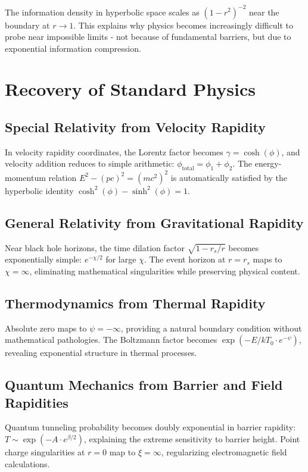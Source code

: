 \documentclass[12pt,a4paper]{article}
\begin{document}
The information density in hyperbolic space scales as $(1-r^2)^{-2}$ near the boundary at $r \to 1$. This explains why physics becomes increasingly difficult to probe near impossible limits - not because of fundamental barriers, but due to exponential information compression.

\section{Recovery of Standard Physics}

\subsection{Special Relativity from Velocity Rapidity}

In velocity rapidity coordinates, the Lorentz factor becomes $\gamma = \cosh(\phi)$, and velocity addition reduces to simple arithmetic: $\phi_{\text{total}} = \phi_1 + \phi_2$. The energy-momentum relation $E^2 - (pc)^2 = (mc^2)^2$ is automatically satisfied by the hyperbolic identity $\cosh^2(\phi) - \sinh^2(\phi) = 1$.

\subsection{General Relativity from Gravitational Rapidity}

Near black hole horizons, the time dilation factor $\sqrt{1 - r_s/r}$ becomes exponentially simple: $e^{-\chi/2}$ for large $\chi$. The event horizon at $r = r_s$ maps to $\chi = \infty$, eliminating mathematical singularities while preserving physical content.

\subsection{Thermodynamics from Thermal Rapidity}

Absolute zero maps to $\psi = -\infty$, providing a natural boundary condition without mathematical pathologies. The Boltzmann factor becomes $\exp(-E/kT_0 \cdot e^{-\psi})$, revealing exponential structure in thermal processes.

\subsection{Quantum Mechanics from Barrier and Field Rapidities}

Quantum tunneling probability becomes doubly exponential in barrier rapidity: $T \sim \exp(-A \cdot e^{\beta/2})$, explaining the extreme sensitivity to barrier height. Point charge singularities at $r = 0$ map to $\xi = \infty$, regularizing electromagnetic field calculations.
\end{document}
